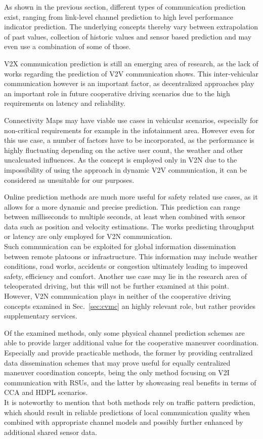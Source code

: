 \documentclass[conference]{IEEEtran}
\begin{document}
As shown in the previous section, different types of communication prediction exist, ranging from link-level channel prediction to high level performance indicator prediction. The underlying concepts thereby vary between extrapolation of past values, collection of historic values and sensor based prediction and may even use a combination of some of those.

V2X communication prediction is still an emerging area of research, as the lack of works regarding the prediction of V2V communication shows.
This inter-vehicular communication however is an important factor, as decentralized approaches play an important role in future cooperative driving scenarios due to the high requirements on latency and reliability.

Connectivity Maps may have viable use cases in vehicular scenarios, especially for non-critical requirements for example in the infotainment area. However even for this use case, a number of factors have to be incorporated, as the performance is highly fluctuating depending on the active user count, the weather and other uncalcuated influences. As the concept is employed only in V2N due to the impossibility of using the approach in dynamic V2V communication, it can be considered as unsuitable for our purposes.

Online prediction methods are much more useful for safety related use cases, as it allows for a more dynamic and precise prediction. This prediction can range between milliseconds to multiple seconds, at least when combined with sensor data such as position and velocity estimations.
The works predicting throughput or latency are only employed for V2N communication.\\
Such communication can be exploited for global information dissemination between remote platoons or infrastructure. This information may include weather conditions, road works, accidents or congestion ultimately leading to improved safety, efficiency and comfort. Another use case may lie in the research area of teleoperated driving, but this will not be further examined at this point.\\
However, V2N communication plays in neither of the cooperative driving concepts examined in Sec.~\ref{sec:cvmc} an highly relevant role, but rather provides supplementary services.

Of the examined methods, only some physical channel prediction schemes are able to provide larger additional value for the cooperative maneuver coordination. Especially \cite{zengChannelPredictionBased2017} and \cite{alieievPredictiveCommunicationIts2018} provide practicable methods, the former by providing centralized data dissemination schemes that may prove useful for equally centralized maneuver coordination concepts, being the only method focusing on V2I communication with RSUs, and the latter by showcasing real benefits in terms of CCA and HDPL scenarios.\\
It is noteworthy to mention that both methods rely on traffic pattern prediction, which should result in reliable predictions of local communication quality when combined with appropriate channel models and possibly further enhanced by additional shared sensor data.
\end{document}
